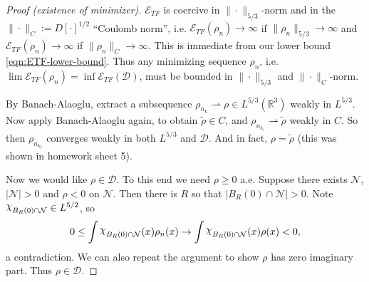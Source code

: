 \documentclass[11pt]{amsart}
\newcommand{\R}{\mathbb{R}}
\DeclareRobustCommand{\Chi}{{\mathpalette\irchi\relax}}
\newcommand{\irchi}[2]{\raisebox{\depth}{$#1\chi$}} %
\renewcommand{\tilde}{\widetilde}
\renewcommand{\tilde}{\widetilde}
\theoremstyle{definition}
\theoremstyle{definition}
\theoremstyle{definition}
\numberwithin{equation}{section}
\begin{document}
\begin{proof}[Proof (existence of minimizer)]
$\mathcal{E}_{TF}$ is coercive in $\|\cdot\|_{5/3}$-norm and in the $\|\cdot\|_C:=D[\cdot]^{1/2}$ ``Coulomb norm'', i.e. $\mathcal{E}_{TF}(\rho_n)\to\infty$ if $\|\rho_n\|_{5/3}\to\infty$ and $\mathcal{E}_{TF}(\rho_n)\to\infty$ if $\|\rho_n\|_C\to\infty$. This is immediate from our lower bound \eqref{eqn:ETF-lower-bound}. Thus any minimizing sequence $\rho_n$, i.e. $\lim\mathcal{E}_{TF}(\rho_n)=\inf\mathcal{E}_{TF}(\mathcal{D})$, must be bounded in $\|\cdot\|_{5/3}$ and $\|\cdot\|_C$-norm.

By Banach-Alaoglu, extract a subsequence $\rho_{n_k}\rightharpoonup\rho\in L^{5/3}(\R^3)$ weakly in $L^{5/3}$. Now apply Banach-Alaoglu again, to obtain $\tilde{\rho}\in C$, and $\rho_{n_{k_\ell}}\rightharpoonup\tilde{\rho}$ weakly in $C$. So then $\rho_{n_{k_\ell}}$ converges weakly in both $L^{5/3}$ and $\mathcal{D}$. And in fact, $\rho=\tilde{\rho}$ (this was shown in homework sheet 5). %

Now we would like $\rho\in\mathcal{D}$. To this end we need $\rho\ge0$ a.e. Suppose there exists $\mathcal{N}$, $|\mathcal{N}|>0$ and $\rho<0$ on $\mathcal{N}$. Then there is $R$ so that $|B_R(0)\cap\mathcal{N}|>0$. Note $\Chi_{B_R(0)\cap\mathcal{N}}\in L^{5/2}$, so
\[
0\le\int\Chi_{B_R(0)\cap\mathcal{N}}(x)\rho_n(x)\to\int \Chi_{B_R(0)\cap\mathcal{N}}(x)\rho(x)<0,
\]
a contradiction. We can also repeat the argument to show $\rho$ has zero imaginary part. %
Thus $\rho\in\mathcal{D}$.


\end{proof}
\end{document}
